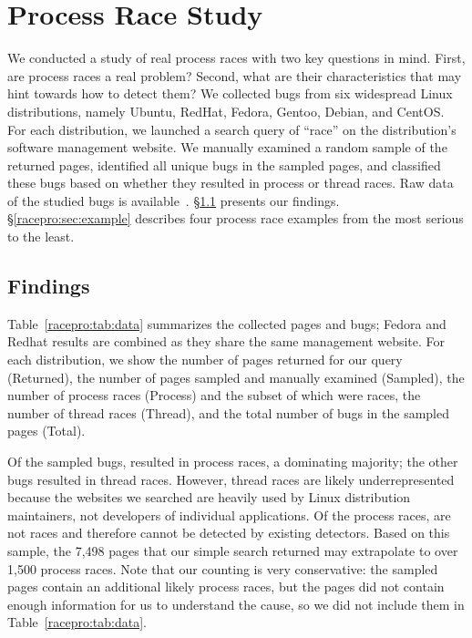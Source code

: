 \section{Process Race Study} \label{racepro:sec:study}

We conducted a study of real process races with two key questions in
mind.  First, are process races a real problem?  Second, what are their
characteristics that may hint towards how to detect them?  We
collected bugs from six widespread Linux distributions, namely 
Ubuntu, RedHat, Fedora, Gentoo, Debian, and CentOS.  For each
distribution, we launched a search query of ``race'' on the distribution's
software management website.  We manually examined a random sample of
the returned pages, identified all unique bugs in the sampled pages,
and classified these bugs based on whether they resulted in process
or thread races.  Raw data of the studied bugs is 
available~\cite{all-resource-races}.
\S\ref{racepro:sec:findings} presents our findings. \S\ref{racepro:sec:example}
describes four process race examples from the most serious to the
least. 

\subsection{Findings} \label{racepro:sec:findings}

Table~\ref{racepro:tab:data} summarizes the collected pages and bugs;
Fedora and Redhat results are combined as they share the same
management website.   For each distribution, we show the number of
pages returned for our query (Returned), the number of pages sampled
and manually examined (Sampled), the number of process races
(Process) and the subset of
which were \toctou races, the number of thread races
(Thread), and the total number of bugs in the sampled pages (Total).

  Of the \nbug sampled bugs, \nprace
resulted in process races, a dominating majority; the other \nmrace
bugs resulted in thread races.  However, thread races are
likely underrepresented because the websites we searched are heavily
used by Linux distribution maintainers, not developers of individual
applications.  Of the \nprace process races, 
\nnottoctou are not \toctou races and therefore cannot
be detected by existing \toctou detectors. 
Based on this sample, the 7,498 pages that our simple search returned
may extrapolate to over 1,500 process races.  Note that our
counting is very conservative: the sampled pages contain an additional
\npraceunconfirmed likely process races, but the pages did
not contain enough information for us to understand the cause, so we
did not include them in Table~\ref{racepro:tab:data}.

